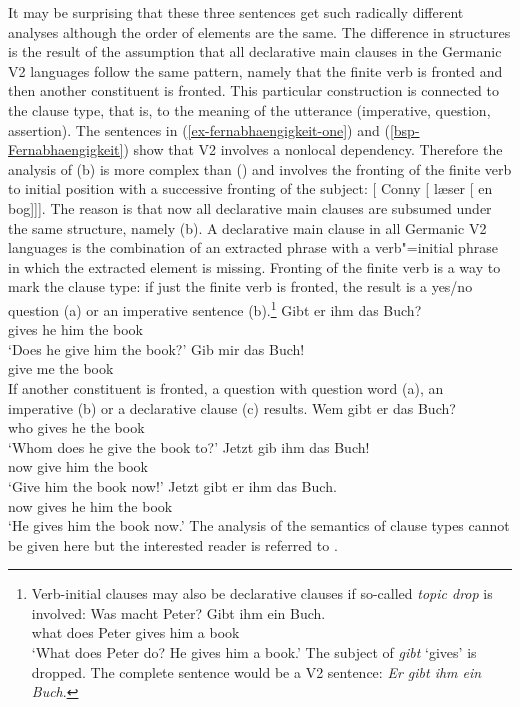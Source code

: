 \noindent
It may be surprising that these three sentences get such radically different analyses although the
order of elements are the same. The difference in structures is the result of the assumption that
all declarative main clauses in the Germanic V2 languages follow the same pattern, namely that the
finite verb is fronted and then another constituent is fronted. This particular construction is
connected to the clause type, that is, to the meaning of the utterance (imperative, question,
assertion). The sentences in (\ref{ex-fernabhaengigkeit-one}) and (\ref{bsp-Fernabhaengigkeit}) show
that V2 involves a nonlocal dependency. Therefore the analysis
of (b) is more complex than () and involves the fronting of the finite verb to initial
position with a successive fronting of the subject:
\ea
{}[ Conny [ læser [ en bog]]].
\z
\largerpage
The reason is that now all declarative main clauses are subsumed under the same structure, namely
(b). A declarative main clause in all Germanic V2 languages is the combination of an extracted
phrase with a verb"=initial phrase in which the extracted element is missing. Fronting of the finite
verb is a way to mark the clause type: if just the finite verb is fronted, the result is a yes/no question (a)
or an imperative sentence (b).\footnote{
  Verb-initial clauses may also be declarative clauses if so-called \emph{topic drop} \citep{Fries88b} is involved:
  \ea
  \gll Was macht Peter? Gibt ihm ein Buch.\\
       what does Peter  gives him a book\\\german
  \glt `What does Peter do? He gives him a book.'
  \z
  The subject of \emph{gibt} `gives' is dropped. The complete sentence would be a V2 sentence:
  \emph{Er gibt ihm ein Buch}.
}
\eal
\ex 
\gll Gibt er ihm das Buch?\\
     gives he him the book\\\german
\glt `Does he give him the book?'
\ex 
\gll Gib mir das Buch!\\
     give me the book\\
\zl
If another constituent is fronted, a question with question word (a), an imperative
(b) or a declarative clause (c) results.
\eal
\ex 
\gll Wem gibt er das Buch?\\
     who gives he the book\\\german
\glt `Whom does he give the book to?'
\ex 
\gll Jetzt gib ihm das Buch!\\
     now give him the book\\
\glt `Give him the book now!'
\ex 
\gll Jetzt gibt er ihm das Buch.\\
     now gives he him the book\\
\glt `He gives him the book now.'
\zl
The analysis of the semantics of clause types cannot be given here but the interested reader is
referred to .



